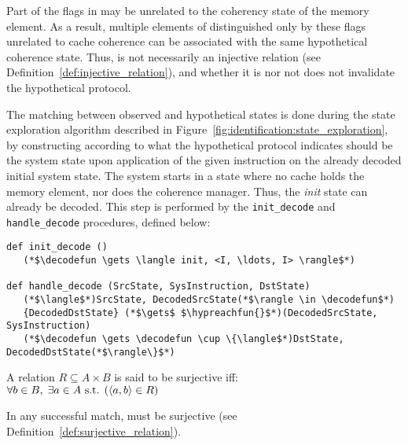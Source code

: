 Part of the flags in \validarchboolflags{} may be unrelated to the coherency
state of the memory element. As a result, multiple elements of
\validarchboolflags{} distinguished only by these flags unrelated to cache
coherence can be associated with the same hypothetical coherence state. Thus,
\decodefun{} is not necessarily an injective relation (see
Definition~\ref{def:injective_relation}), and whether it is nor not does not
invalidate the hypothetical protocol.

\begin{step}
\label{step:state_matching}
   The matching between observed and hypothetical states is done during the
   state exploration algorithm described in
   Figure~\ref{fig:identification:state_exploration}, by constructing
   \decodefun{} according to what the hypothetical protocol indicates should be
   the system state upon application of the given instruction on the already
   decoded initial system state. The system starts in a state where no cache
   holds the memory element, nor does the coherence manager. Thus, the
   \textit{init} state can already be decoded. This step is performed by the
   \lstinline!init_decode! and \lstinline!handle_decode! procedures, defined
   below:

\begin{lstlisting}
def init_decode ()
   (*$\decodefun \gets \langle init, <I, \ldots, I> \rangle$*)

def handle_decode (SrcState, SysInstruction, DstState)
   (*$\langle$*)SrcState, DecodedSrcState(*$\rangle \in \decodefun$*)
   {DecodedDstState} (*$\gets$ $\hypreachfun{}$*)(DecodedSrcState, SysInstruction)
   (*$\decodefun \gets \decodefun \cup \{\langle$*)DstState, DecodedDstState(*$\rangle\}$*)
\end{lstlisting}
\end{step}

\begin{definition}
\label{def:surjective_relation}
A relation $R \subseteq A \times B$ is said to be surjective iff:\\
$
   \forallin{b}{B}{
      \existsin{a}{A}{
         \langle a, b \rangle \in R
      }
   }%
$
\end{definition}

\begin{property}
\label{pro:decode_is_surjective}
In any successful match, \decodefun{} must be surjective (see
Definition~\ref{def:surjective_relation}).
\end{property}

